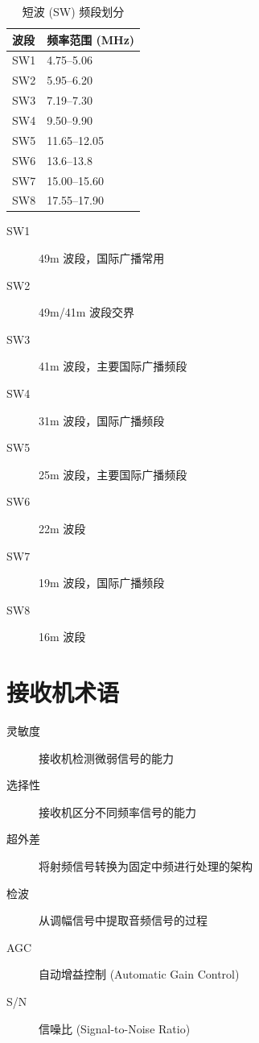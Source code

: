 \begin{table}[h]
    \centering
    \caption{短波 (SW) 频段划分}
    \begin{tabular}{ll}
        \hline
        \textbf{波段} & \textbf{频率范围 (MHz)} \\
        \hline
        SW1 & 4.75–5.06 \\
        SW2 & 5.95–6.20 \\
        SW3 & 7.19–7.30 \\
        SW4 & 9.50–9.90 \\
        SW5 & 11.65–12.05 \\
        SW6 & 13.6–13.8 \\
        SW7 & 15.00–15.60 \\
        SW8 & 17.55–17.90 \\
        \hline
    \end{tabular}
    \label{tab:sw_bands}
\end{table}

\begin{description}
    \item[SW1] 49m 波段，国际广播常用
    \item[SW2] 49m/41m 波段交界
    \item[SW3] 41m 波段，主要国际广播频段
    \item[SW4] 31m 波段，国际广播频段
    \item[SW5] 25m 波段，主要国际广播频段
    \item[SW6] 22m 波段
    \item[SW7] 19m 波段，国际广播频段
    \item[SW8] 16m 波段
\end{description}

\section{接收机术语}

\begin{description}
    \item[灵敏度] 接收机检测微弱信号的能力
    \item[选择性] 接收机区分不同频率信号的能力
    \item[超外差] 将射频信号转换为固定中频进行处理的架构
    \item[检波] 从调幅信号中提取音频信号的过程
    \item[AGC] 自动增益控制 (Automatic Gain Control)
    \item[S/N] 信噪比 (Signal-to-Noise Ratio)
\end{description}

